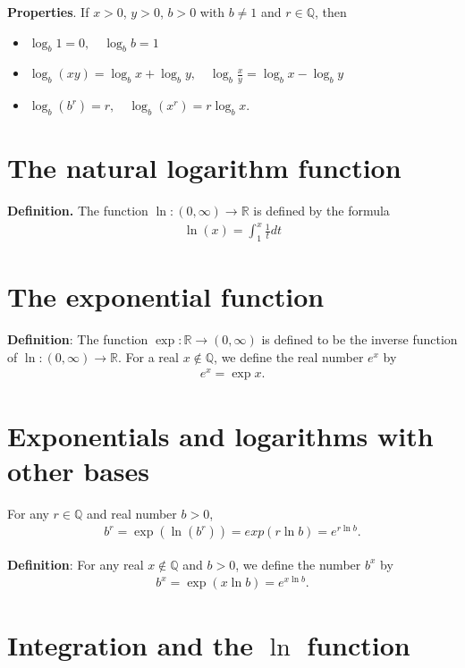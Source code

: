 \documentclass{report}
\begin{document}
	\textbf{Properties}. If $x>0$, $y>0$, $b>0$ with $b \neq 1$ and $r \in \mathbb{Q}$, then
	\begin{itemize}
		\item $\log_b 1 = 0, \quad \log_b b = 1$
		\item $\log_b(xy) = \log_b x+\log_b y, \quad \log_b \frac{x}{y} = \log_b x - \log_b y$
		\item $\log_b (b^r) = r, \quad \log_b (x^r) = r\log_b x$.
	\end{itemize}

	\section{The natural logarithm function}
	
	\textbf{Definition.} The function $\ln :(0,\infty) \to \mathbb{R}$ is defined by the formula
	\begin{align*}
		\ln(x) = \int_1^x \frac{1}{t} dt
	\end{align*}

	\section{The exponential function}

	\textbf{Definition}: The function $\exp: \mathbb{R} \to (0, \infty)$ is defined to be the inverse function of $\ln:(0,\infty) \to \mathbb{R}$. For a real $x \notin \mathbb{Q}$, we define the real number $e^x$ by
	\begin{align*}
		e^x = \exp x.
	\end{align*}

	\section{Exponentials and logarithms with other bases}

	For any $r \in \mathbb{Q}$ and real number $b > 0$,
	\begin{align*}
		b^r = \exp(\ln(b^r)) = exp(r\ln b) = e^{r\ln b}.
	\end{align*}

	\textbf{Definition}: For any real $x \notin \mathbb{Q}$ and $b > 0$, we define the number $b^x$ by
	\begin{align*}
		b^x = \exp(x\ln b) = e^{x\ln b}.
	\end{align*}

	\section{Integration and the $\ln$ function}
\end{document}
